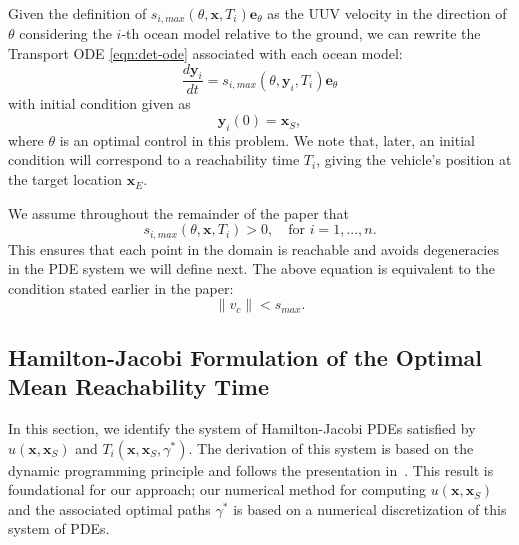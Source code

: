 \documentclass[pdflatex,sn-mathphys-num]{sn-jnl}%
\def \bx{{\mathbf {x}}}
\def \by{{\mathbf {y}}}
\def \be{{\mathbf {e}}}
\theoremstyle{thmstyleone}%
\theoremstyle{thmstyletwo}%
\theoremstyle{thmstylethree}%
\begin{document}
Given the definition of $s_{i,max}(\theta,\bx,T_i)\be_\theta$ as the UUV velocity in the direction of $\theta$ considering the $i$-th ocean model relative to the ground, we can rewrite the Transport ODE \eqref{eqn:det-ode} associated with each ocean model:
\begin{equation}
    \frac{d\by_i}{dt} =  s_{i,max}(\theta,\by_i,T_i)\be_{\theta}
    \label{eq:ODErewritten}
\end{equation}
with initial condition given as 
\begin{equation}
    \by_i(0) = \bx_S,
    \label{eq:ODE_ic_rewritten}
\end{equation}
where $\theta$ is an optimal control in this problem.  We note that, later, an initial condition will correspond to a reachability time $T_i$, giving the vehicle's position at the target location $\bx_E$.


We assume throughout the remainder of the paper that 
\begin{equation}
    s_{i,max}(\theta,\bx, T_i) > 0, \quad \text{for } i=1,...,n.
\end{equation}
This ensures that each point in the domain is reachable and avoids degeneracies in the PDE system we will define next.  The above equation is equivalent to the condition stated earlier in the paper:
\begin{equation}
\lVert v_c \rVert < s_{max}.
\end{equation}



\subsection{Hamilton-Jacobi Formulation of the Optimal Mean Reachability Time}
\label{subsec:HJ}

In this section, we identify the system of Hamilton-Jacobi PDEs satisfied by $u(\bx,\bx_S)$ and $T_i(\bx,\bx_S,\gamma^*)$.  The derivation of this system is based on the dynamic programming principle and follows the presentation in~\cite{Brandman2023}.  This result is foundational for our approach; our numerical method for computing $u(\bx,\bx_S)$ and the associated optimal paths $\gamma^*$ is based on a numerical discretization of this system of PDEs.
\\
\end{document}
